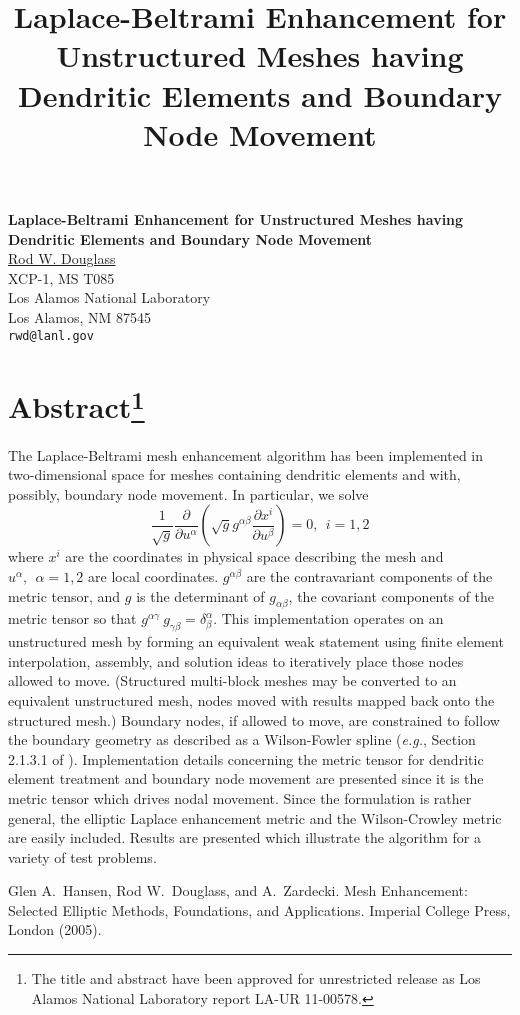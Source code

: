 \title{Laplace-Beltrami Enhancement for Unstructured Meshes having Dendritic Elements and Boundary Node Movement}
\author{} \institute{}

\begin{center}

\textbf{\Large Laplace-Beltrami Enhancement for Unstructured Meshes having Dendritic Elements and Boundary Node Movement}\\
\vspace{10mm}
{\large \underline{Rod W. Douglass}}\\
XCP-1, MS T085\\
Los Alamos National Laboratory \\
Los Alamos, NM 87545\\
{\tt rwd@lanl.gov}

\end{center}

\section*{Abstract\footnote{The title and abstract have been approved for unrestricted release as Los Alamos 
National Laboratory report LA-UR 11-00578.}}

The Laplace-Beltrami mesh enhancement algorithm \cite{Hansen05} has been implemented in two-dimensional space for meshes containing dendritic elements and with, possibly, boundary node movement. In particular, we solve
\begin{equation*}
\frac{1}{\sqrt{g}} \frac{\partial}{\partial u^{\alpha}}\left(\sqrt{g} g^{\alpha \beta}
 \frac{\partial x^i}{\partial u^{\beta}} \right) = 0, \ \ i = 1,2
 \end{equation*}
\noindent where $x^i$ are the coordinates in physical space describing the mesh and $u^{\alpha}, \ \ \alpha=1,2$ are local coordinates.  $g^{\alpha \beta}$ are the contravariant components of the metric tensor, and $g$ is the determinant of $g_{\alpha \beta}$, the covariant components of the metric tensor so that $g^{\alpha\gamma}\ g_{\gamma \beta} = \delta^{\alpha}_{\beta}$. This implementation operates on an unstructured mesh by forming an equivalent weak statement using finite element interpolation, assembly, and solution ideas to iteratively place those nodes allowed to move.  (Structured multi-block meshes may be converted to an equivalent unstructured mesh, nodes moved with results mapped back onto the structured mesh.)  Boundary nodes, if allowed to move, are constrained to follow the boundary geometry as described as a Wilson-Fowler spline ({\it e.g.}, Section 2.1.3.1 of \cite{Hansen05}).  Implementation details concerning the metric tensor for dendritic element treatment and boundary node movement are presented since it is the metric tensor which drives nodal movement. Since the formulation is rather general, the elliptic Laplace enhancement metric and the Wilson-Crowley metric are easily included.  Results are presented which illustrate the algorithm for a variety of test problems.


\begin{thebibliography}{10}

{\sc Glen A.~Hansen, Rod W.~Douglass, and A.~Zardecki}. {Mesh Enhancement: 
Selected Elliptic Methods, Foundations, and Applications}. Imperial College Press, London (2005).

\end{thebibliography}
